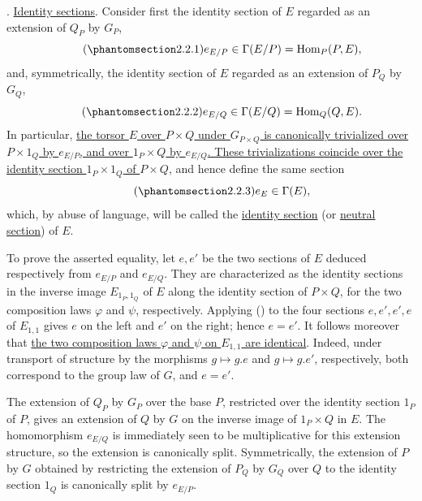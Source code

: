 
. \underline{Identity sections}. Consider first the identity section
of $E$ regarded as an extension of $Q_P$ by $G_P$,
\begin{equation}\tag{\SGARefTarget{sga7.sga7i.evii.n2-2-1}{2.2.1}}
 e_{E/P}\in\Gamma(E/P)=\operatorname{Hom}_P(P,E),
\end{equation}
and, symmetrically, the identity section of $E$ regarded as an extension
of $P_Q$ by $G_Q$,
\begin{equation}\tag{\SGARefTarget{sga7.sga7i.evii.n2-2-2}{2.2.2}}
 e_{E/Q}\in\Gamma(E/Q)=\operatorname{Hom}_Q(Q,E).
\end{equation}
In particular, \underline{the torsor $E$ over $P\times Q$ under
$G_{P\times Q}$ is canonically trivialized over $P\times1_Q$ by
$e_{E/P}$, and over $1_P\times Q$ by $e_{E/Q}$. These trivializations
coincide over the identity section $1_P\times1_Q$ of $P\times Q$}, and
hence define the same section
\begin{equation}\tag{\SGARefTarget{sga7.sga7i.evii.n2-2-3}{2.2.3}}
 e_E\in\Gamma(E),
\end{equation}
which, by abuse of language, will be called the \underline{identity
section} (or \underline{neutral section}) of $E$.


To prove the asserted equality, let $e,e'$ be the two sections of $E$
deduced respectively from $e_{E/P}$ and $e_{E/Q}$. They are
characterized as the identity sections in the inverse image
$E_{1_P,1_Q}$ of $E$ along the identity section of $P\times Q$, for the
two composition laws $\varphi$ and $\psi$, respectively. Applying
() to the four sections $e,e',e',e$ of $E_{1,1}$ gives $e$ on
the left and $e'$ on the right; hence $e=e'$. It follows moreover that
\underline{the two composition laws $\varphi$ and $\psi$ on $E_{1,1}$
are identical}. Indeed, under transport of structure by the morphisms
$g\mapsto g.e$ and $g\mapsto g.e'$, respectively, both correspond to
the group law of $G$, and $e=e'$.

The extension of $Q_P$ by $G_P$ over the base $P$, restricted over the
identity section $1_P$ of $P$, gives an extension of $Q$ by $G$ on the
inverse image of $1_P\times Q$ in $E$. The homomorphism $e_{E/Q}$ is
immediately seen to be multiplicative for this extension structure, so
the extension is canonically split. Symmetrically, the extension of $P$
by $G$ obtained by restricting the extension of $P_Q$ by $G_Q$ over
$Q$ to the identity section $1_Q$ is canonically split by $e_{E/P}$.

